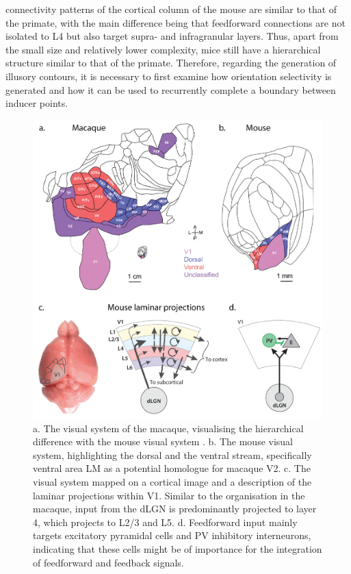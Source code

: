 \documentclass[12pt]{article}
\begin{document}
connectivity patterns of the cortical column of the mouse are similar to that of the primate, with the main difference being that feedforward connections are not isolated to L4 but also target supra- and infragranular layers. Thus, apart from the small size and relatively lower complexity, mice still have a hierarchical structure similar to that of the primate. Therefore, regarding the generation of illusory contours, it is necessary to first examine how orientation selectivity is generated and how it can be used to recurrently complete a boundary between inducer points.

\begin{figure}[H]
  \centering
  \includegraphics[width=1.0 \textwidth]{adjusted_figures/Laminar_Figure.png}
  \caption{a. The visual system of the macaque, visualising the hierarchical difference with the mouse visual system \autocite{gamanutAnatomicalFunctionalConnectomes2022}. b. The mouse visual system, highlighting the dorsal and the ventral stream, specifically ventral area LM as a potential homologue for macaque V2. c. The visual system mapped on a cortical image and a description of the laminar projections within V1. Similar to the organisation in the macaque, input from the dLGN is predominantly projected to layer 4, which projects to L2/3 and L5. d. Feedforward input mainly targets excitatory pyramidal cells and PV inhibitory interneurons, indicating that these cells might be of importance for the integration of feedforward and feedback signals.
  \autocite{niellHowCorticalCircuits2021}}
  \label{fig:Laminar_Figure}
\end{figure}
\end{document}

